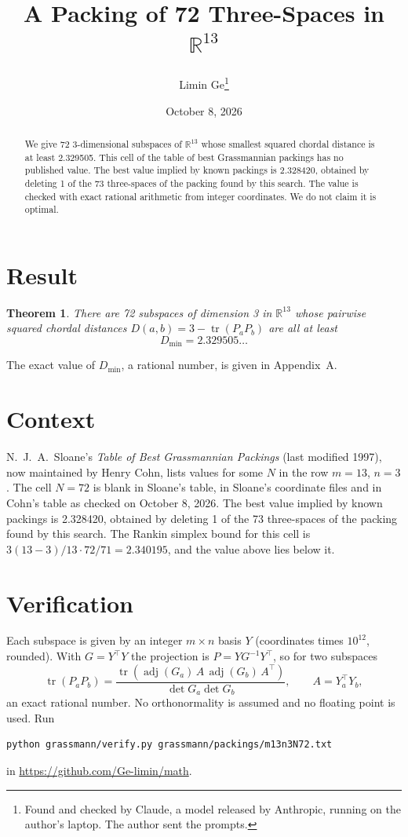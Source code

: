 \documentclass[11pt,a4paper]{article}
\title{A Packing of 72 Three-Spaces in $\mathbb{R}^{13}$}
\author{Limin Ge\thanks{Found and checked by Claude, a model released by Anthropic, running on the author's laptop. The author sent the prompts.}}
\date{October 8, 2026}
\newtheorem*{theorem}{Theorem}
\begin{document}
\maketitle
\begin{abstract}
We give 72 3-dimensional subspaces of $\mathbb{R}^{13}$ whose smallest squared chordal distance is at least 2.329505. This cell of the table of best Grassmannian packings has no published value. The best value implied by known packings is 2.328420, obtained by deleting 1 of the 73 three-spaces of the packing found by this search. The value is checked with exact rational arithmetic from integer coordinates. We do not claim it is optimal.
\end{abstract}

\section{Result}
\begin{theorem}
There are 72 subspaces of dimension 3 in $\mathbb{R}^{13}$ whose pairwise squared chordal distances $D(a,b) = 3 - \operatorname{tr}(P_aP_b)$ are all at least
\[ D_{\min} = 2.329505\ldots \]
\end{theorem}
The exact value of $D_{\min}$, a rational number, is given in Appendix~A.


\section{Context}
N.~J.~A.~Sloane's \emph{Table of Best Grassmannian Packings} (last modified 1997), now maintained by Henry Cohn, lists values for some $N$ in the row $m=13$, $n=3$. The cell $N=72$ is blank in Sloane's table, in Sloane's coordinate files and in Cohn's table as checked on October 8, 2026. The best value implied by known packings is 2.328420, obtained by deleting 1 of the 73 three-spaces of the packing found by this search. The Rankin simplex bound for this cell is $3(13-3)/13\cdot 72/71 = 2.340195$, and the value above lies below it.


\section{Verification}
Each subspace is given by an integer $m\times n$ basis $Y$ (coordinates times $10^{12}$, rounded). With $G=Y^\top Y$ the projection is $P=YG^{-1}Y^\top$, so for two subspaces
\[ \operatorname{tr}(P_aP_b)=\frac{\operatorname{tr}(\operatorname{adj}(G_a)\,A\,\operatorname{adj}(G_b)\,A^\top)}{\det G_a\det G_b},\qquad A=Y_a^\top Y_b, \]
an exact rational number. No orthonormality is assumed and no floating point is used. Run
\begin{verbatim}
python grassmann/verify.py grassmann/packings/m13n3N72.txt
\end{verbatim}
in \url{https://github.com/Ge-limin/math}.
\end{document}
